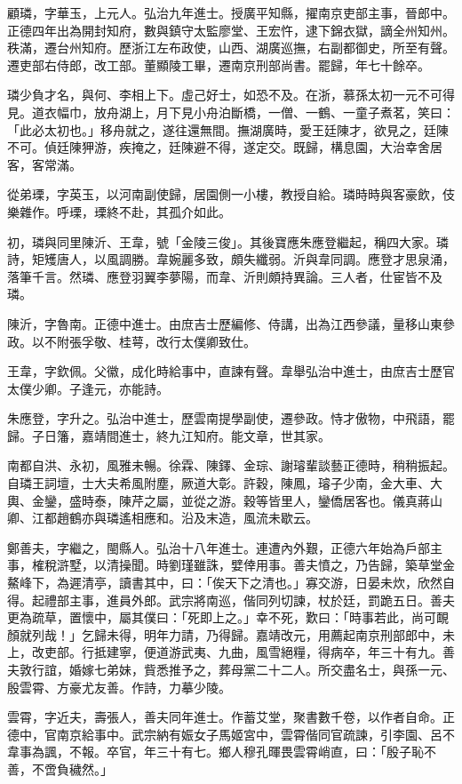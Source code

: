 \begin{pinyinscope}
顧璘，字華玉，上元人。弘治九年進士。授廣平知縣，擢南京吏部主事，晉郎中。正德四年出為開封知府，數與鎮守太監廖堂、王宏忤，逮下錦衣獄，謫全州知州。秩滿，遷台州知府。歷浙江左布政使，山西、湖廣巡撫，右副都御史，所至有聲。遷吏部右侍郎，改工部。董顯陵工畢，遷南京刑部尚書。罷歸，年七十餘卒。

璘少負才名，與何、李相上下。虛己好士，如恐不及。在浙，慕孫太初一元不可得見。道衣幅巾，放舟湖上，月下見小舟泊斷橋，一僧、一鶴、一童子煮茗，笑曰：「此必太初也。」移舟就之，遂往還無間。撫湖廣時，愛王廷陳才，欲見之，廷陳不可。偵廷陳狎游，疾掩之，廷陳避不得，遂定交。既歸，構息園，大治幸舍居客，客常滿。

從弟瑮，字英玉，以河南副使歸，居園側一小樓，教授自給。璘時時與客豪飲，伎樂雜作。呼瑮，瑮終不赴，其孤介如此。

初，璘與同里陳沂、王韋，號「金陵三俊」。其後寶應朱應登繼起，稱四大家。璘詩，矩矱唐人，以風調勝。韋婉麗多致，頗失纖弱。沂與韋同調。應登才思泉涌，落筆千言。然璘、應登羽翼李夢陽，而韋、沂則頗持異論。三人者，仕宦皆不及璘。

陳沂，字魯南。正德中進士。由庶吉士歷編修、侍講，出為江西參議，量移山東參政。以不附張孚敬、桂萼，改行太僕卿致仕。

王韋，字欽佩。父徽，成化時給事中，直諫有聲。韋舉弘治中進士，由庶吉士歷官太僕少卿。子逢元，亦能詩。

朱應登，字升之。弘治中進士，歷雲南提學副使，遷參政。恃才傲物，中飛語，罷歸。子日籓，嘉靖間進士，終九江知府。能文章，世其家。

南都自洪、永初，風雅未暢。徐霖、陳鐸、金琮、謝璿輩談藝正德時，稍稍振起。自璘王詞壇，士大夫希風附塵，厥道大彰。許穀，陳鳳，璿子少南，金大車、大輿、金鑾，盛時泰，陳芹之屬，並從之游。穀等皆里人，鑾僑居客也。儀真蔣山卿、江都趙鶴亦與璘遙相應和。沿及末造，風流未歇云。

鄭善夫，字繼之，閩縣人。弘治十八年進士。連遭內外艱，正德六年始為戶部主事，榷稅滸墅，以清操聞。時劉瑾雖誅，嬖倖用事。善夫憤之，乃告歸，築草堂金鰲峰下，為遲清亭，讀書其中，曰：「俟天下之清也。」寡交游，日晏未炊，欣然自得。起禮部主事，進員外郎。武宗將南巡，偕同列切諫，杖於廷，罰跪五日。善夫更為疏草，置懷中，屬其僕曰：「死即上之。」幸不死，歎曰：「時事若此，尚可靦顏就列哉！」乞歸未得，明年力請，乃得歸。嘉靖改元，用薦起南京刑部郎中，未上，改吏部。行抵建寧，便道游武夷、九曲，風雪絕糧，得病卒，年三十有九。善夫敦行誼，婚嫁七弟妹，貲悉推予之，葬母黨二十二人。所交盡名士，與孫一元、殷雲霄、方豪尤友善。作詩，力摹少陵。

雲霄，字近夫，壽張人，善夫同年進士。作蓄艾堂，聚書數千卷，以作者自命。正德中，官南京給事中。武宗納有娠女子馬姬宮中，雲霄偕同官疏諫，引李園、呂不韋事為諷，不報。卒官，年三十有七。鄉人穆孔暉畏雲霄峭直，曰：「殷子恥不善，不啻負穢然。」


\end{pinyinscope}
